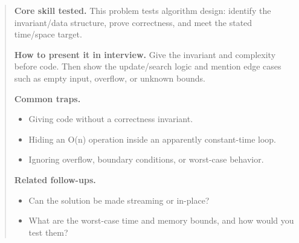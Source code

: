\documentclass[11pt,letterpaper,openany]{book}
\newenvironment{EditorialNote}
  {\begin{quote}\small\setlength{\parskip}{0.25em}}
  {\end{quote}}
\newcommand{\QuestionSpacer}{\vspace{0.4em}}
\begin{document}
\begin{EditorialNote}


\textbf{Core skill tested.} This problem tests algorithm design: identify the invariant/data structure, prove correctness, and meet the stated time/space target.


\textbf{How to present it in interview.} Give the invariant and complexity before code. Then show the update/search logic and mention edge cases such as empty input, overflow, or unknown bounds.


\textbf{Common traps.}
\begin{itemize}
\item Giving code without a correctness invariant.
\item Hiding an O(n) operation inside an apparently constant-time loop.
\item Ignoring overflow, boundary conditions, or worst-case behavior.
\end{itemize}


\textbf{Related follow-ups.}
\begin{itemize}
\item Can the solution be made streaming or in-place?
\item What are the worst-case time and memory bounds, and how would you test them?
\end{itemize}


\end{EditorialNote}
\QuestionSpacer
\end{document}

